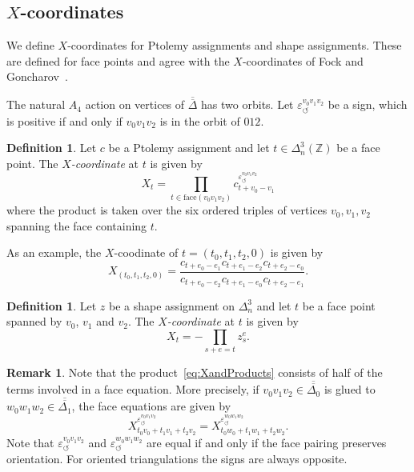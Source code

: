 \documentclass[12pt]{amsart}
\theoremstyle{definition}
\newtheorem{definition}[theorem]{Definition}
\newtheorem{remark}[theorem]{Remark}
\numberwithin{equation}{section}
\def\dtruncsimp{\overline{\overline{\Delta}}}
\def\Z{\mathbb{Z}}
\begin{document}
\subsection{$X$-coordinates}
We define $X$-coordinates for Ptolemy assignments and shape assignments. These are defined for face points and agree with the $X$-coordinates of Fock and Goncharov~\cite[p.~133]{FockGoncharov}.

The natural $A_4$ action on vertices of $\dtruncsimp$ has two orbits. Let $\varepsilon_\circlearrowleft^{v_0v_1v_2}$ be a sign, which is positive if and only if $v_0v_1v_2$ is in the orbit of $012$.%
\begin{definition} Let $c$ be a Ptolemy assignment and let $t\in\Delta_n^3(\Z)$ be a face point. 
The \emph{$X$-coordinate} at $t$ is given by
\begin{equation}
X_t=\prod_{t\in \mathrm{face}(v_0v_1v_2)}c^{\varepsilon_\circlearrowleft^{v_0v_1v_2}}_{t+v_0-v_1}
\end{equation} 
where the product is taken over the six ordered triples of vertices $v_0, v_1, v_2$ spanning the face containing $t$.
\end{definition}
As an example, the $X$-coodinate of $t=(t_0,t_1,t_2,0)$ is given by
\begin{equation}\label{eq:XExample}
X_{(t_0,t_1,t_2,0)}=\frac{c_{t+e_0-e_1}c_{t+e_1-e_2}c_{t+e_2-e_0}}{c_{t+e_0-e_2}c_{t+e_1-e_0}c_{t+e_2-e_1}}.
\end{equation}


\begin{definition} 
Let $z$ be a shape assignment on $\Delta^3_n$ and let $t$ be a face point spanned by $v_0$, $v_1$ and $v_2$. The \emph{$X$-coordinate} at $t$ is given by
\begin{equation}\label{eq:XandProducts}
X_t=-\prod_{s+e=t}z^e_s.
\end{equation}
\end{definition} 

\begin{remark}\label{rm:HalfofFaceEq}
Note that the product~\eqref{eq:XandProducts} consists of half of the terms involved in a face equation. More precisely, if $v_0v_1v_2\in\overline{\overline{\Delta_0}}$ is glued to $w_0w_1w_2\in\overline{\overline{\Delta_1}}$, the face equations are given by 
\begin{equation}
X_{t_0v_0+t_1v_1+t_2v_2}^{\varepsilon_\circlearrowleft^{v_0v_1v_2}}=X_{t_0w_0+t_1w_1+t_2w_2}^{\varepsilon_\circlearrowleft^{w_0w_1w_2}}.
\end{equation}
 Note that $\varepsilon_\circlearrowleft^{v_0v_1v_2}$ and $\varepsilon_\circlearrowleft^{w_0w_1w_2}$ are equal if and only if the face pairing preserves orientation. For oriented triangulations the signs are always opposite.
\end{remark}
\end{document}
